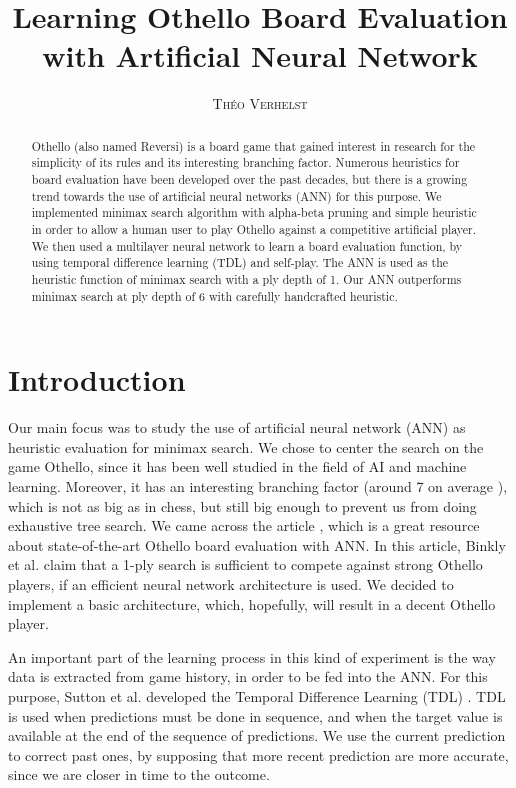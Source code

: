 \documentclass[a4paper, 9pt, twoside, twocolumn]{article}
\title{Learning Othello Board Evaluation with Artificial Neural Network}
\author{\textsc{Théo Verhelst}}
\begin{document}
\maketitle

\begin{abstract}
Othello (also named Reversi) is a board game that gained interest in research
for the simplicity of its rules and its interesting branching factor. Numerous
heuristics for board evaluation have been developed over the past decades, but
there is a growing trend towards the use of artificial neural networks (ANN) for
this purpose. We implemented minimax search algorithm with alpha-beta pruning
and simple heuristic in order to allow a human user to play Othello against a
competitive artificial player. We then used a multilayer neural network to learn
a board evaluation function, by using temporal difference learning (TDL) and
self-play. The ANN is used as the heuristic function of minimax search with a
ply depth of 1. Our ANN outperforms minimax search at ply depth of 6 with
carefully handcrafted heuristic.
\end{abstract}

\section{Introduction}
Our main focus was to study the use of artificial neural
network (ANN) as heuristic evaluation for minimax search. We chose to center the
search on the game Othello, since it has been well studied in the field of AI
and machine learning. Moreover, it has an interesting branching factor (around 7
on average \cite{Leouski1996}), which is not as big as in chess, but still big
enough to prevent us from doing exhaustive tree search. We came across the
article \cite{Binkly2007}, which is a great resource about state-of-the-art
Othello board evaluation with ANN. In this article, Binkly et al. claim that a
1-ply search is sufficient to compete against strong Othello players, if an
efficient neural network architecture is used. We decided to implement a basic
architecture, which, hopefully, will result in a decent Othello player.

An important part of the learning process in this kind of experiment is the way
data is extracted from game history, in order to be fed into the ANN. For this
purpose, Sutton et al. developed the Temporal Difference Learning (TDL)
\cite{Sutton1988}. TDL is used when predictions must be done in sequence, and
when the target value is available at the end of the sequence of predictions. We
use the current prediction to correct past ones, by supposing that more recent
prediction are more accurate, since we are closer in time to the outcome.
\end{document}
